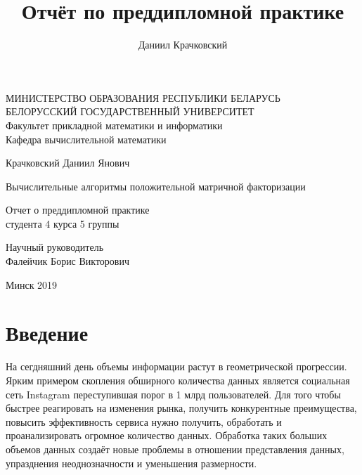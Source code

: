 \documentclass[14pt]{extarticle}
\author{Даниил Крачковский}
\title{Отчёт по преддипломной практике}
\begin{document}
\begin{titlepage}

\newpage

\begin{center}
МИНИСТЕРСТВО ОБРАЗОВАНИЯ РЕСПУБЛИКИ БЕЛАРУСЬ \\
БЕЛОРУССКИЙ ГОСУДАРСТВЕННЫЙ УНИВЕРСИТЕТ \\
Факультет прикладной математики и информатики \\
Кафедра вычислительной математики
\end{center}

\vspace{8em}
    
    \begin{center}
    \Large Крачковский Даниил Янович
    \end{center}

    \begin{center}
    \Large Вычислительные алгоритмы положительной матричной факторизации
    \end{center}

    \vspace{2.5em}

    \begin{center}
    	Отчет о преддипломной практике \\
    	студента 4 курса 5 группы
    \end{center}

    \vspace{6em}
    
    \begin{flushright}
    	Научный руководитель \\
		Фалейчик Борис Викторович
    \end{flushright}
    
    \vfill

    \begin{center}
    	Минск 2019
    \end{center}

    \end{titlepage}

\tableofcontents


\newpage


\section{Введение}
На сегдняшний день объемы информации растут в геометрической прогрессии. Ярким примером  скопления обширного количества данных является социальная сеть Instagram переступившая порог в 1 млрд пользователей. Для того чтобы быстрее реагировать на изменения рынка, получить конкурентные преимущества, повысить эффективность сервиса нужно получить, обработать и проанализировать огромное количество данных. Обработка таких больших объемов данных создаёт новые проблемы в отношении представления данных, упразднения неоднозначности и уменьшения размерности.
\end{document}
